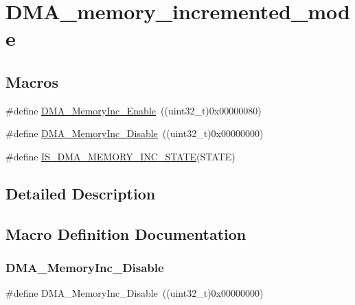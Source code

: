 \hypertarget{group___d_m_a__memory__incremented__mode}{}\section{D\+M\+A\+\_\+memory\+\_\+incremented\+\_\+mode}
\label{group___d_m_a__memory__incremented__mode}
\subsection*{Macros}
\begin{DoxyCompactItemize}
\item 
\#define \mbox{\hyperlink{group___d_m_a__memory__incremented__mode_ga4e8cb23d039c74bbbf365d7678835bbb}{D\+M\+A\+\_\+\+Memory\+Inc\+\_\+\+Enable}}~((uint32\+\_\+t)0x00000080)
\item 
\#define \mbox{\hyperlink{group___d_m_a__memory__incremented__mode_ga795a277c997048783a383b026f19a5ab}{D\+M\+A\+\_\+\+Memory\+Inc\+\_\+\+Disable}}~((uint32\+\_\+t)0x00000000)
\item 
\#define \mbox{\hyperlink{group___d_m_a__memory__incremented__mode_gaa880f39d499d1e80449cf80381e4eb67}{I\+S\+\_\+\+D\+M\+A\+\_\+\+M\+E\+M\+O\+R\+Y\+\_\+\+I\+N\+C\+\_\+\+S\+T\+A\+TE}}(S\+T\+A\+TE)
\end{DoxyCompactItemize}


\subsection{Detailed Description}


\subsection{Macro Definition Documentation}
\mbox{\label{group___d_m_a__memory__incremented__mode_ga795a277c997048783a383b026f19a5ab}} 
\subsubsection{\texorpdfstring{DMA\_MemoryInc\_Disable}{DMA\_MemoryInc\_Disable}}
{\footnotesize\ttfamily \#define D\+M\+A\+\_\+\+Memory\+Inc\+\_\+\+Disable~((uint32\+\_\+t)0x00000000)}

